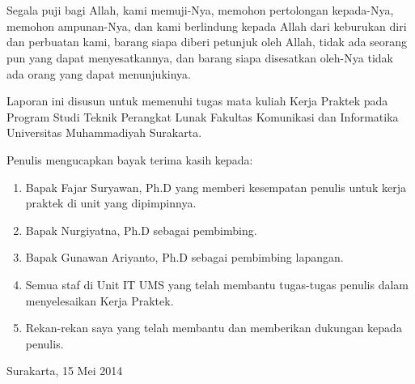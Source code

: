 \chapter*{\kataPengantar}
 Segala puji bagi Allah, kami memuji-Nya, memohon pertolongan kepada-Nya, memohon ampunan-Nya, dan kami berlindung kepada Allah dari keburukan diri dan perbuatan kami, barang siapa diberi petunjuk oleh Allah, tidak ada seorang pun yang dapat menyesatkannya, dan barang siapa disesatkan oleh-Nya tidak ada orang yang dapat menunjukinya.
 
 Laporan ini disusun untuk memenuhi tugas mata kuliah Kerja Praktek pada Program Studi Teknik Perangkat Lunak Fakultas Komunikasi dan Informatika Universitas Muhammadiyah Surakarta.
 
 \noindent
 Penulis mengucapkan bayak terima kasih kepada:
 \begin{enumerate}[itemsep=-1ex]
 \item Bapak Fajar Suryawan, Ph.D yang memberi kesempatan penulis untuk kerja praktek di unit yang dipimpinnya.
 \item Bapak Nurgiyatna, Ph.D sebagai pembimbing.
 \item Bapak Gunawan Ariyanto, Ph.D sebagai pembimbing lapangan.
 \item Semua staf di Unit IT UMS yang telah membantu tugas-tugas penulis dalam menyelesaikan Kerja Praktek.
 \item Rekan-rekan saya yang telah membantu dan memberikan dukungan kepada penulis.
 \end{enumerate}

\vspace*{0.1cm}
\begin{flushright}
Surakarta, 15 Mei 2014\\[0.1cm]
\vspace*{1cm}
\penulis

\end{flushright}